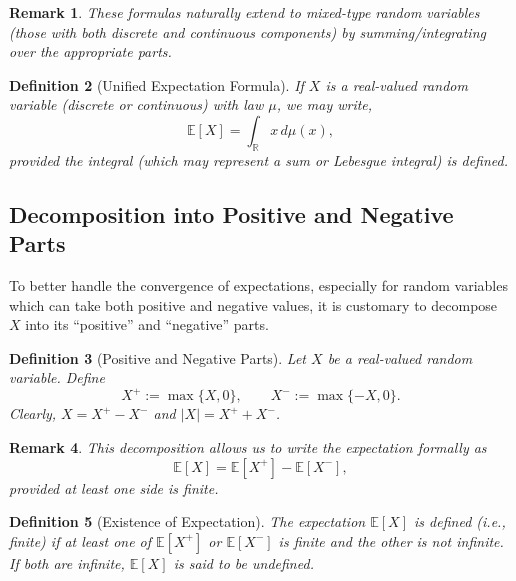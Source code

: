 \documentclass[12pt]{article}
\newtheorem{definition}{Definition}[section]
\newtheorem{remark}[definition]{Remark}
\begin{document}
\begin{remark}
These formulas naturally extend to mixed-type random variables (those with both discrete and continuous components) by summing/integrating over the appropriate parts.
\end{remark}

\begin{definition}[Unified Expectation Formula]
    If $X$ is a real-valued random variable (discrete or continuous) with law $\mu$, we may write,
    \[
        \mathbb{E}[X] = \int_{\mathbb{R}} x \, d\mu(x),
    \]
    provided the integral (which may represent a sum or Lebesgue integral) is defined.
\end{definition}

\subsection{Decomposition into Positive and Negative Parts}

To better handle the convergence of expectations, especially for random variables which can take both positive and negative values, it is customary to decompose $X$ into its ``positive'' and ``negative'' parts.

\begin{definition}[Positive and Negative Parts]
Let $X$ be a real-valued random variable. Define
\[
X^+ := \max\{X, 0\}, \qquad X^- := \max\{-X, 0\}.
\]
Clearly, $X = X^+ - X^-$ and $|X| = X^+ + X^-$.
\end{definition}

\begin{remark}
This decomposition allows us to write the expectation formally as
\[
\mathbb{E}[X] = \mathbb{E}[X^+] - \mathbb{E}[X^-],
\]
provided at least one side is finite.
\end{remark}

\begin{definition}[Existence of Expectation]
    The expectation $\mathbb{E}[X]$ is \emph{defined} (i.e., finite) if at least one of $\mathbb{E}[X^+]$ or $\mathbb{E}[X^-]$ is finite and the other is not infinite. If both are infinite, $\mathbb{E}[X]$ is said to be \emph{undefined}.
\end{definition}
\end{document}
